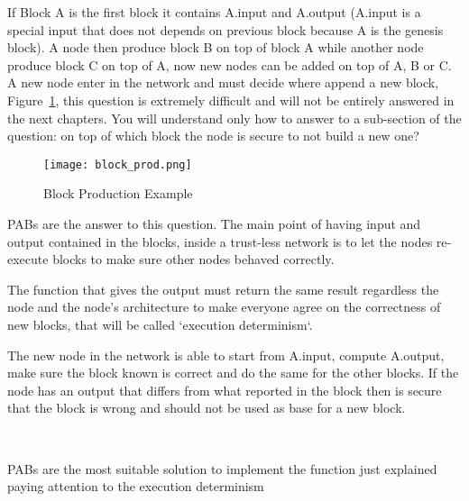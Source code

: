 \documentclass[../main.tex]{subfiles}
\begin{document}
If Block A is the first block it contains A.input and A.output (A.input is a special input that does not depends on previous block because A is the genesis block). A node then produce block B on top of block A while another node produce block C on top of A, now new nodes can be added on top of A, B or C. A new node enter in the network and must decide where append a new block, Figure~\ref{fig:block_prod}, this question is extremely difficult and will not be entirely answered in the next chapters. You will understand only how to answer to a sub-section of the question: on top of which block the node is secure to not build a new one?

\begin{figure}[h]
  \centering
  \texttt{[image: block\_prod.png]}
  \caption{Block Production Example}
  \label{fig:block_prod}
\end{figure}

PABs are the answer to this question. The main point of having input and output contained in the blocks, inside a trust-less network is to let the nodes re-execute blocks to make sure other nodes behaved correctly.

The function that gives the output must return the same result regardless the node and the node's architecture to make everyone agree on the correctness of new blocks, that will be called `execution determinism`.

The new node in the network is able to start from A.input, compute A.output, make sure the block known is correct and do the same for the other blocks. If the node has an output that differs from what reported in the block then is secure that the block is wrong and should not be used as base for a new block.

\

PABs are the most suitable solution to implement the function just explained paying attention to the execution determinism
\end{document}
